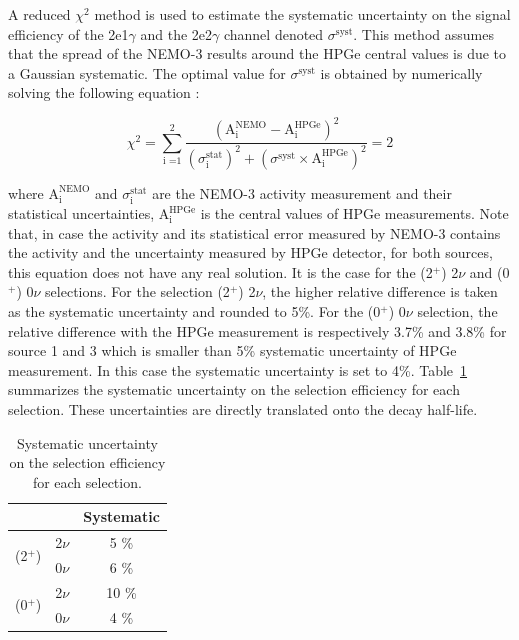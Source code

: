 \documentclass[main.tex]{subfiles}
\begin{document}

\NI A reduced $\chi^{\text{2}}$ method is used to estimate the systematic uncertainty on the signal efficiency of the 2e1$\gamma$ and the 2e2$\gamma$ channel denoted $\sigma^{\text{syst}}$. This method assumes that the spread of the NEMO-3 results around the HPGe central values is due to a Gaussian systematic. The optimal value for $\sigma^{\text{syst}}$ is obtained by numerically solving the following equation : 
 

\begin{equation}
\chi^2 = \sum_{\text{i =1}}^{\text{2}} \frac{(\text{A}_\text{i}^{\text{NEMO}} - \text{A}_\text{i}^{\text{HPGe}})^\text{2}} {(\sigma_\text{i}^{\text{stat}})^\text{2} + (\sigma^{\text{syst}} \times \text{A}_\text{i}^{\text{HPGe}})^\text{2}} = \text{2}
\end{equation}


\NI where $\text{A}_\text{i}^{\text{NEMO}}$ and $\sigma_\text{i}^{\text{stat}}$ are the NEMO-3 activity measurement and their statistical uncertainties, $\text{A}_\text{i}^{\text{HPGe}}$ is the central values of HPGe measurements. Note that, in case the activity and its statistical error measured by NEMO-3 contains the activity and the uncertainty measured by HPGe detector, for both sources, this equation does not have any real solution. It is the case for the (2$^+$) 2$\nu$ and (0$^+$) 0$\nu$ selections. For the selection (2$^+$) 2$\nu$, the higher relative difference is taken as the systematic uncertainty and rounded to 5\%. For the (0$^+$) 0$\nu$ selection, the relative difference with the HPGe measurement is respectively 3.7\% and 3.8\% for source 1 and 3 which is smaller than 5\% systematic uncertainty of HPGe measurement. In this case the systematic uncertainty is set to 4\%. Table~\ref{Tab:summaryEffSyst} summarizes the systematic uncertainty on the selection efficiency for each selection. These uncertainties are directly translated onto the decay half-life.


\begin{table}[h!]
\centering
\begin{tabular}{cc|c}
& & Systematic \\
\toprule
\multirow{2}{*}{(2$^+$)} & 2$\nu$ & 5 \% \\
                         & 0$\nu$ & 6 \% \\ 
\hline
\multirow{2}{*}{(0$^+$)} & 2$\nu$ & 10 \% \\
                         & 0$\nu$ & 4 \% \\ 
\bottomrule
\end{tabular}
\caption{Systematic uncertainty on the selection efficiency for each selection.}
\label{Tab:summaryEffSyst}
\end{table}
\end{document}
